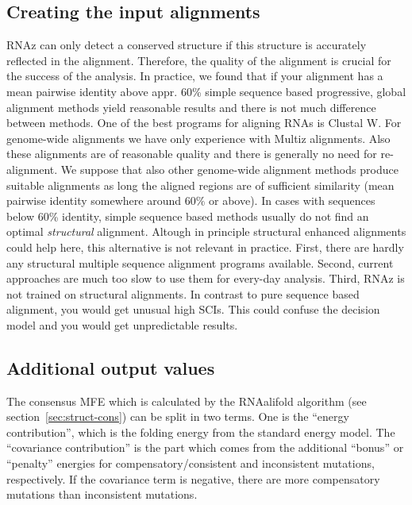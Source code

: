 \documentclass[11pt]{article}
\begin{document}
\subsection{Creating the input alignments}
\label{sec:creat-input-alignm}

RNAz can only detect a conserved structure if this structure is accurately
reflected in the alignment. Therefore, the quality of the alignment is
crucial for the success of the analysis. In practice, we found that if your
alignment has a mean pairwise identity above appr. 60\% simple sequence
based progressive, global alignment methods yield reasonable results and
there is not much difference between methods. One of the best programs for
aligning RNAs is Clustal W. For genome-wide alignments we have only
experience with Multiz alignments. Also these alignments are of reasonable
quality and there is generally no need for re-alignment. We suppose that
also other genome-wide alignment methods produce suitable alignments as
long the aligned regions are of sufficient similarity (mean pairwise
identity somewhere around $60\%$ or above). In cases with sequences below
60\% identity, simple sequence based methods usually do not find an optimal
\emph{structural} alignment. Altough in principle structural enhanced
alignments could help here, this alternative is not relevant in practice.
First, there are hardly any structural multiple sequence alignment programs
available. Second, current approaches are much too slow to use them for
every-day analysis. Third, RNAz is not trained on structural alignments. In
contrast to pure sequence based alignment, you would get unusual high SCIs.
This could confuse the decision model and you would get unpredictable
results.

\subsection{Additional output values}
\label{sec:addit-outp-valu}

The consensus MFE which is calculated by the RNAalifold algorithm (see
section~\ref{sec:struct-cons}) can be split in two terms.  One is the
``energy contribution'', which is the folding energy from the standard
energy model. The ``covariance contribution'' is the part which comes from
the additional ``bonus'' or ``penalty'' energies for
compensatory/consistent and inconsistent mutations, respectively. If the
covariance term is negative, there are more compensatory mutations than
inconsistent mutations.
\end{document}
